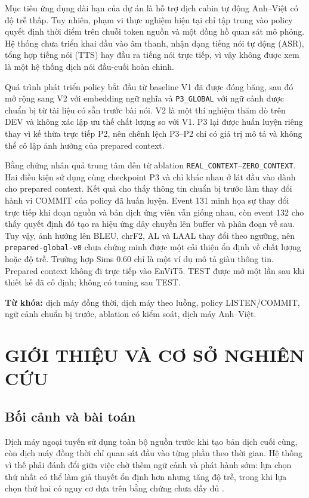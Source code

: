 \documentclass[11pt,a4paper]{article}
\numberwithin{figure}{section}
\numberwithin{table}{section}
\begin{document}
Mục tiêu ứng dụng dài hạn của dự án là hỗ trợ dịch cabin tự động Anh--Việt có độ trễ thấp. Tuy nhiên, phạm vi thực nghiệm hiện tại chỉ tập trung vào policy quyết định thời điểm trên chuỗi token nguồn và một đồng hồ quan sát mô phỏng. Hệ thống chưa triển khai đầu vào âm thanh, nhận dạng tiếng nói tự động (ASR), tổng hợp tiếng nói (TTS) hay đầu ra tiếng nói trực tiếp, vì vậy không được xem là một hệ thống dịch nói đầu-cuối hoàn chỉnh.

Quá trình phát triển policy bắt đầu từ baseline V1 đã được đóng băng, sau đó mở rộng sang V2 với embedding ngữ nghĩa và \texttt{P3\_GLOBAL} với ngữ cảnh được chuẩn bị từ tài liệu có sẵn trước bài nói. V2 là một thí nghiệm thăm dò trên DEV và không xác lập ưu thế chất lượng so với V1. P3 lại được huấn luyện riêng thay vì kế thừa trực tiếp P2, nên chênh lệch P3--P2 chỉ có giá trị mô tả và không thể cô lập ảnh hưởng của prepared context.

Bằng chứng nhân quả trung tâm đến từ ablation \texttt{REAL\_CONTEXT}--\texttt{ZERO\_CONTEXT}. Hai điều kiện sử dụng cùng checkpoint P3 và chỉ khác nhau ở lát đầu vào dành cho prepared context. Kết quả cho thấy thông tin chuẩn bị trước làm thay đổi hành vi COMMIT của policy đã huấn luyện. Event 131 minh họa sự thay đổi trực tiếp khi đoạn nguồn và bản dịch ứng viên vẫn giống nhau, còn event 132 cho thấy quyết định đó tạo ra hiệu ứng dây chuyền lên buffer và phân đoạn về sau. Tuy vậy, ảnh hưởng lên BLEU, chrF2, AL và LAAL thay đổi theo ngưỡng, nên \texttt{prepared-global-v0} chưa chứng minh được một cải thiện ổn định về chất lượng hoặc độ trễ. Trường hợp Sims 0.60 chỉ là một ví dụ mô tả giàu thông tin. Prepared context không đi trực tiếp vào EnViT5. TEST được mở một lần sau khi thiết kế đã cố định; không có tuning sau TEST.

\noindent\textbf{Từ khóa:} dịch máy đồng thời, dịch máy theo luồng, policy LISTEN/COMMIT, ngữ cảnh chuẩn bị trước, ablation có kiểm soát, dịch máy Anh--Việt.

\clearpage
\begingroup
\small
{}
\tableofcontents
\endgroup
\clearpage
{}

\section{GIỚI THIỆU VÀ CƠ SỞ NGHIÊN CỨU}

\subsection{Bối cảnh và bài toán}
Dịch máy ngoại tuyến sử dụng toàn bộ nguồn trước khi tạo bản dịch cuối cùng, còn dịch máy đồng thời chỉ quan sát đầu vào từng phần theo thời gian. Hệ thống vì thế phải đánh đổi giữa việc chờ thêm ngữ cảnh và phát hành sớm: lựa chọn thứ nhất có thể làm giả thuyết ổn định hơn nhưng tăng độ trễ, trong khi lựa chọn thứ hai có nguy cơ dựa trên bằng chứng chưa đầy đủ \citep{ma2019stacl,arivazhagan2019monotonic}.
\end{document}
